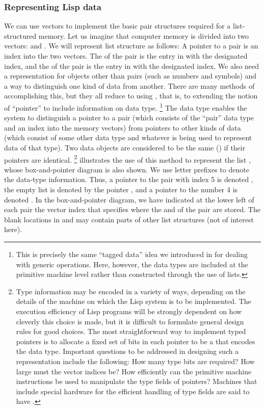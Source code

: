 \subsubsection*{Representing Lisp data}

We can use vectors to implement the basic pair structures required for a list-structured memory.
Let us imagine that computer memory is divided into two vectors:
 and .
We will represent list structure as follows:
A pointer to a pair is an index into the two vectors.
The  of the pair is the entry in  with the designated index, and the  of the pair is the entry in  with the designated index.
We also need a representation for objects other than pairs (such as numbers and symbols) and a way to distinguish one kind of data from another.
There are many methods of accomplishing this, but they all reduce to using , that is, to extending the notion of “pointer” to include information on data type.%
\footnote{
	This is precisely the same “tagged data” idea we introduced in  for dealing with generic operations.
	Here, however, the data types are included at the primitive machine level rather than constructed through the use of lists.
}
The data type enables the system to distinguish a pointer to a pair (which consists of the “pair” data type and an index into the memory vectors) from pointers to other kinds of data (which consist of some other data type and whatever is being used to represent data of that type).
Two data objects are considered to be the same () if their pointers are identical.%
\footnote{
	Type information may be encoded in a variety of ways, depending on the details of the machine on which the Lisp system is to be implemented.
	The execution efficiency of Lisp programs will be strongly dependent on how cleverly this choice is made, but it is difficult to formulate general design rules for good choices.
	The most straightforward way to implement typed pointers is to allocate a fixed set of bits in each pointer to be a  that encodes the data type.
	Important questions to be addressed in designing such a representation include the following:
	How many type bits are required?
	How large must the vector indices be?
	How efficiently can the primitive machine instructions be used to manipulate the type fields of pointers?
	Machines that include special hardware for the efficient handling of type fields are said to have .
}
 illustrates the use of this method to represent the list , whose box-and-pointer diagram is also shown.
We use letter prefixes to denote the data-type information.
Thus, a pointer to the pair with index 5 is denoted , the empty list is denoted by the pointer , and a pointer to the number 4 is denoted .
In the box-and-pointer diagram, we have indicated at the lower left of each pair the vector index that specifies where the  and  of the pair are stored.
The blank locations in  and  may contain parts of other list structures (not of interest here).

